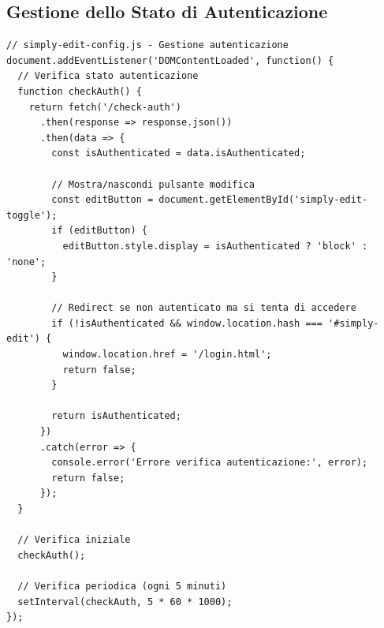 \subsection{Gestione dello Stato di Autenticazione}
\begin{verbatim}
// simply-edit-config.js - Gestione autenticazione
document.addEventListener('DOMContentLoaded', function() {
  // Verifica stato autenticazione
  function checkAuth() {
    return fetch('/check-auth')
      .then(response => response.json())
      .then(data => {
        const isAuthenticated = data.isAuthenticated;
        
        // Mostra/nascondi pulsante modifica
        const editButton = document.getElementById('simply-edit-toggle');
        if (editButton) {
          editButton.style.display = isAuthenticated ? 'block' : 'none';
        }
        
        // Redirect se non autenticato ma si tenta di accedere
        if (!isAuthenticated && window.location.hash === '#simply-edit') {
          window.location.href = '/login.html';
          return false;
        }
        
        return isAuthenticated;
      })
      .catch(error => {
        console.error('Errore verifica autenticazione:', error);
        return false;
      });
  }
  
  // Verifica iniziale
  checkAuth();
  
  // Verifica periodica (ogni 5 minuti)
  setInterval(checkAuth, 5 * 60 * 1000);
});
\end{verbatim}

